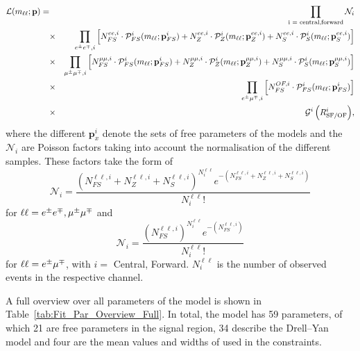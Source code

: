 \begin{eqnarray*}
{\mathcal{L}}(m_{\ell\ell};\mathbf{p}) =&&   \prod_{\text{i = central,forward}} \mathcal{N}_i\\
                        &\times& \prod_{\EE,i}\left[N_{FS}^{ee,i} \cdot {\mathcal{P}}_{FS}^i(m_{\ell\ell};\mathbf{p}_{FS}^i) %
                                                  + N_{Z}^{ee,i} \cdot {\mathcal{P}}_{Z}^i(m_{\ell\ell};\mathbf{p}_{Z}^{ee,i}) %
                                                  + N_{S}^{ee,i} \cdot {\mathcal{P}}_{S}^i(m_{\ell\ell};\mathbf{p}_{S}^{ee,i})\right] \\
                        &\times& \prod_{\MM,i}\left[N_{FS}^{\mu\mu,i} \cdot {\mathcal{P}}_{FS}^i(m_{\ell\ell};\mathbf{p}_{FS}^i) %
                                                  + N_{Z}^{\mu\mu,i} \cdot {\mathcal{P}}_{Z}^i(m_{\ell\ell};\mathbf{p}_{Z}^{\mu\mu,i}) %
                                                  + N_{S}^{\mu\mu,i} \cdot {\mathcal{P}}_{S}^i(m_{\ell\ell};\mathbf{p}_{S}^{\mu\mu,i})\right] \\
                        &\times& \prod_{\EM,i}\left[N_{FS}^{OF,i} \cdot {\mathcal{P}}_{FS}^i(m_{\ell\ell};\mathbf{p}_{FS}^i)\right] \\   
                        &\times& {\mathcal{G}^i\left(\Rsfof^i\right)}, \\
\end{eqnarray*}
where the different $\mathbf{p}^i_{x}$ denote the sets of free parameters of the models and the $\mathcal{N}_i$ are Poisson factors taking into account the normalisation of the different samples. These factors take the form of
\begin{equation*}
\mathcal{N}_i = \frac{(N_{FS}^{\ell\ell,i} + N_{Z}^{\ell\ell,i} + N_{S}^{\ell\ell,i})^{N_i^{\ell\ell}} e^{-(N_{FS}^{\ell\ell,i} + N_{Z}^{\ell\ell,i} + N_{S}^{\ell\ell,i})}}{N_i^{\ell\ell}!}
\end{equation*} 
for $\ell\ell = e^\pm e^\mp, \mu^\pm\mu^\mp$ and
\begin{equation*}
\mathcal{N}_i = \frac{(N_{FS}^{\ell\ell,i})^{N_i^{\ell\ell}} e^{-(N_{FS}^{\ell\ell,i})}}{N_i^{\ell\ell}!}
\end{equation*}
for $\ell\ell = e^\pm\mu^\mp$, with $i =$ Central, Forward. $N_i^{\ell\ell}$ is the number of observed events in the respective channel. 

A full overview over all parameters of the model is shown in Table~\ref{tab:Fit_Par_Overview_Full}. In total, the model has 59 parameters, of which 21 are free parameters in the signal region, 34 describe the Drell--Yan model and four are the mean values and widths of \Rsfof used in the constraints. 


